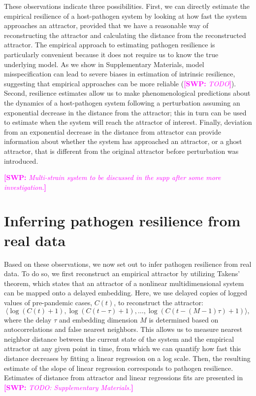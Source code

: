 \documentclass[12pt]{article}
\newcommand{\comment}{\showcomment}
\newcommand{\showcomment}[3]{\textcolor{#1}{\textbf{[#2: }\textsl{#3}\textbf{]}}}
\newcommand{\swp}[1]{\comment{magenta}{SWP}{#1}}
\begin{document}
These observations indicate three possibilities.
First, we can directly estimate the empirical resilience of a host-pathogen system by looking at how fast the system approaches an attractor, provided that we have a reasonable way of reconstructing the attractor and calculating the distance from the reconstructed attractor.
The empirical approach to estimating pathogen resilience is particularly convenient because it does not require us to know the true underlying model.
As we show in Supplementary Materials, model misspecification can lead to severe biases in estimation of intrinsic resilience, suggesting that empirical approaches can be more reliable (\swp{TODO}).
Second, resilience estimates allow us to make phenomenological predictions about the dynamics of a host-pathogen system following a perturbation assuming an exponential decrease in the distance from the attractor;
this in turn can be used to estimate when the system will reach the attractor of interest. 
Finally, deviation from an exponential decrease in the distance from attractor can provide information about whether the system has approached an attractor, or a ghost attractor, that is different from the original attractor before perturbation was introduced.

\swp{Multi-strain system to be discussed in the supp after some more investigation.}

\section*{Inferring pathogen resilience from real data}

Based on these observations, we now set out to infer pathogen resilience from real data.
To do so, we first reconstruct an empirical attractor by utilizing Takens' theorem, which states that an attractor of a nonlinear multidimensional system can be mapped onto a delayed embedding.
Here, we use delayed copies of logged values of pre-pandemic cases, $C(t)$, to reconstruct the attractor:
\begin{equation}
\langle\log(C(t)+1), \log(C(t-\tau)+1), \dots, \log(C(t-(M-1)\tau)+1)\rangle,
\end{equation}
where the delay $\tau$ and embedding dimension $M$ is determined based on autocorrelations and false nearest neighbors.
This allows us to measure nearest neighbor distance between the current state of the system and the empirical attractor at any given point in time, from which we can quantify how fast this distance decreases by fitting a linear regression on a log scale.
Then, the resulting estimate of the slope of linear regression corresponds to pathogen resilience.
Estimates of distance from attractor and linear regressions fits are presented in \swp{TODO: Supplementary Materials.}
\end{document}

